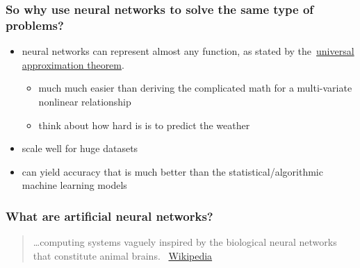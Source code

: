 \documentclass[xcolor=table]{beamer}
\begin{document}
\begin{mdframe}%

\frametitle{So why use neural networks to solve the same type of problems?}\label{heading-sec-so-why-use-neural-networks-to-solve-the-same-type-of-problems}%

\begin{itemize}%

\item{}
neural networks can represent almost any function, as stated by the~\href{https://en.wikipedia.org/wiki/Universal_approximation_theorem}{universal approximation theorem}.%

\begin{itemize}[noitemsep,topsep=\mdcompacttopsep]%

\item{}much much easier than deriving the complicated math for a multi-variate nonlinear relationship%

\item{}think about how hard is is to predict the weather%
\end{itemize}%

\item{}
scale well for huge datasets%

\item{}
can yield accuracy that is much better than the statistical/algorithmic machine learning models%
\end{itemize}%
\end{mdframe}\label{sec-so-why-use-neural-networks-to-solve-the-same-type-of-problems}%

\begin{mdframe}%

\frametitle{What are artificial neural networks?}\label{heading-sec-what-are-artificial-neural-networks}%

\begin{quote}%

\noindent{}\dots{}computing systems vaguely inspired by the biological neural networks that constitute animal brains.\mdbr
{}\textemdash{}~\href{https://en.wikipedia.org/wiki/Artificial_neural_network}{Wikipedia}
\end{quote}%
\end{mdframe}\label{sec-what-are-artificial-neural-networks}%
\end{document}
